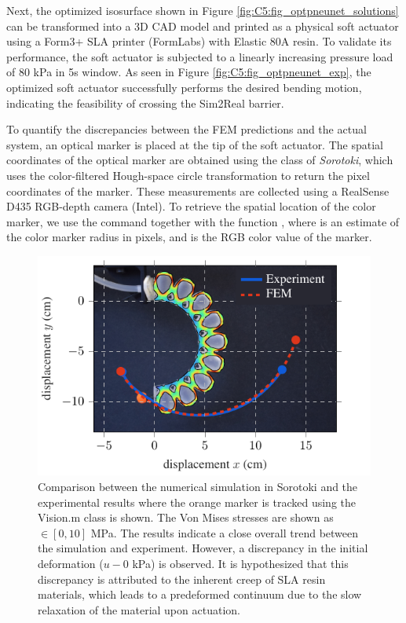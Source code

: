 Next, the optimized isosurface shown in Figure \ref{fig:C5:fig_optpneunet_solutions} can be transformed into a 3D CAD model and printed as a physical soft actuator using a Form3+ SLA printer (FormLabs) with Elastic 80A resin. To validate its performance, the soft actuator is subjected to a linearly increasing pressure load of 80 \si{\kilo \pascal} in 5\si{\second} window. As seen in Figure \ref{fig:C5:fig_optpneunet_exp}, the optimized soft actuator successfully performs the desired bending motion, indicating the feasibility of crossing the Sim2Real barrier.

To quantify the discrepancies between the FEM predictions and the actual system, an optical marker is placed at the tip of the soft actuator. The spatial coordinates of the optical marker are obtained using the  class of \textit{Sorotoki}, which uses the color-filtered Hough-space circle transformation to return the pixel coordinates of the marker. These measurements are collected using a RealSense D435 RGB-depth camera (Intel). To retrieve the spatial location of the color marker, we use the command  together with the function , where  is an estimate of the color marker radius in pixels, and  is the RGB color value of the marker.

\begin{figure}[!t]
    \centering
    \includegraphics*[width=.8\textwidth]{./pdf/thesis-figure-6-25.pdf}
    \caption{Comparison between the numerical simulation in Sorotoki and the experimental results where the orange marker is tracked using the Vision.m class is shown. The Von Mises stresses are shown as \protect{}$\!\!\in [0,10]$ \si{\mega \pascal}. The results indicate a close overall trend between the simulation and experiment. However, a discrepancy in the initial deformation ($u - 0$ kPa) is observed. It is hypothesized that this discrepancy is attributed to the inherent creep of SLA resin materials, which leads to a predeformed continuum due to the slow relaxation of the material upon actuation. }
    \label{fig:C5:fig_optpneunet_exp_compare}
\end{figure}

